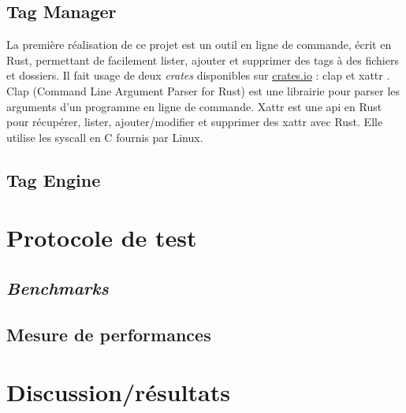 \documentclass[a4paper, 12pt]{article}
\begin{document}
\subsection{Tag Manager}
La première réalisation de ce projet est un outil en ligne de commande, écrit en Rust, permettant 
de facilement lister, ajouter et supprimer des tags à des fichiers et dossiers. Il fait usage de 
deux \textit{crates} disponibles sur \href{https://crates.io}{crates.io} : clap \cite{ref22} et 
xattr \cite{ref23}. Clap (Command Line Argument Parser for Rust) est une librairie pour parser 
les arguments d'un programme en ligne de commande. Xattr est une \acrshort{api} en Rust pour récupérer, lister, 
ajouter/modifier et supprimer des \acrshort{xattr} avec Rust. Elle utilise les \acrshort{syscall} 
en C fournis par Linux.

\subsection{Tag Engine}\label{tag_engine_realisation}
\cite{ref26}
\newpage

\section{Protocole de test} %
\subsection{\textit{Benchmarks}}
\subsection{Mesure de performances}
\newpage

\section{Discussion/résultats} %
\end{document}

